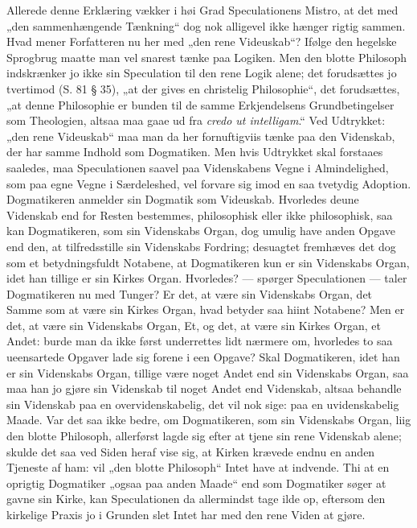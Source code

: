 Allerede denne Erklæring vækker i høi Grad Speculationens Mistro,
at det med „den sammenhængende Tænkning“ dog nok alligevel ikke
hænger rigtig sammen. Hvad mener Forfatteren nu her med „den rene
Videuskab“? Ifølge den hegelske Sprogbrug maatte man vel snarest
tænke paa Logiken. Men den blotte Philosoph indskrænker jo ikke
sin Speculation til den rene Logik alene; det forudsættes jo
tvertimod (S. 81 § 35), „at der gives en christelig Philosophie“,
det forudsættes, „at denne Philosophie er bunden til de samme
Erkjendelsens Grundbetingelser som Theologien, altsaa maa gaae ud
fra \textit{credo ut intelligam}.“ Ved Udtrykket: „den rene
Videuskab“ maa man da her fornuftigviis tænke paa den Videnskab,
der har samme Indhold som Dogmatiken. Men hvis Udtrykket skal
forstaaes saaledes, maa Speculationen saavel paa Videnskabens
Vegne i Almindelighed, som paa egne Vegne i Særdeleshed, vel
forvare sig imod en saa tvetydig Adoption. Dogmatikeren anmelder
sin Dogmatik som Videuskab. Hvorledes deune Videnskab end for
Resten bestemmes, philosophisk eller ikke philosophisk, saa kan
Dogmatikeren, som sin Videnskabs Organ, dog umulig have anden
Opgave end den, at tilfredsstille sin Videnskabs Fordring;
desuagtet fremhæves det
 dog som et betydningsfuldt Notabene, at Dogmatikeren kun er sin
Videnskabs Organ, idet han tillige er sin Kirkes Organ. Hvorledes?
--- spørger Speculationen --- taler Dogmatikeren nu med Tunger? Er
det, at være sin Videnskabs Organ, det Samme som at være sin
Kirkes Organ, hvad betyder saa hiint Notabene? Men er det, at være
sin Videnskabs Organ, Et, og det, at være sin Kirkes Organ, et
Andet: burde man da ikke først underrettes lidt nærmere om,
hvorledes to saa ueensartede Opgaver lade sig forene i een Opgave?
Skal Dogmatikeren, idet han er sin Videnskabs Organ, tillige være
noget Andet end sin Videnskabs Organ, saa maa han jo gjøre sin
Videnskab til noget Andet end Videnskab, altsaa behandle sin
Videnskab paa en overvidenskabelig, det vil nok sige: paa en
uvidenskabelig Maade. Var det saa ikke bedre, om Dogmatikeren, som
sin Videnskabs Organ, liig den blotte Philosoph, allerførst lagde
sig efter at tjene sin rene Videnskab alene; skulde det saa ved
Siden heraf vise sig, at Kirken krævede endnu en anden Tjeneste af
ham: vil „den blotte Philosoph“ Intet have at indvende. Thi at en
oprigtig Dogmatiker „ogsaa paa anden Maade“ end som Dogmatiker
søger at gavne sin Kirke, kan Speculationen da allermindst tage
ilde op, eftersom den kirkelige Praxis jo i Grunden slet Intet har
med den rene Viden at gjøre.

